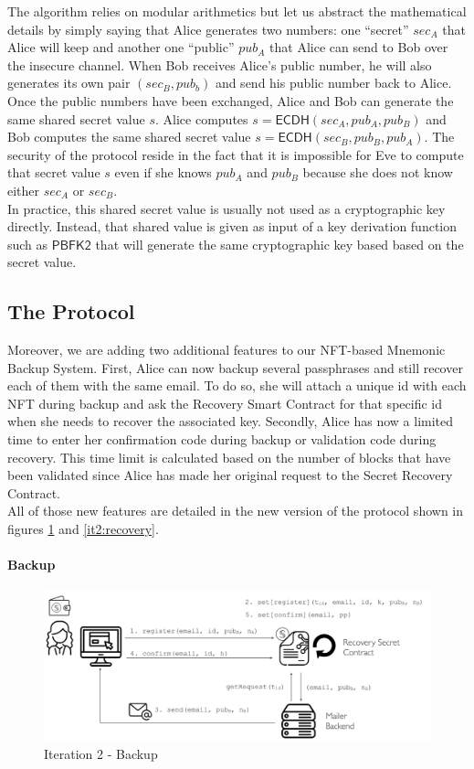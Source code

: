 \documentclass[12pt]{article}
\newcommand{\ms}[1]{\ensuremath{\mathsf{#1}}}
\begin{document}
The algorithm relies on modular arithmetics but let us abstract the mathematical details by simply saying that Alice generates two numbers: one ``secret'' $sec_A$ that Alice will keep and another one ``public'' $pub_A$ that Alice can send to Bob over the insecure channel. When Bob receives Alice's public number, he will also generates its own pair $(sec_B, pub_b)$ and send his public number back to Alice. Once the public numbers have been exchanged, Alice and Bob can generate the same shared secret value $s$. Alice computes $s=\ms{ECDH}(sec_A, pub_A, pub_B)$ and Bob computes the same shared secret value $s=\ms{ECDH}(sec_B, pub_B, pub_A)$. The security of the protocol reside in the fact that it is impossible for Eve to compute that secret value $s$ even if she knows $pub_A$ and $pub_B$ because she does not know either $sec_A$ or $sec_B$. \\

In practice, this shared secret value is usually not used as a cryptographic key directly. Instead, that shared value is given as input of a key derivation function such as $\ms{PBFK2}$ that will generate the same cryptographic key based based on the secret value. 

\subsection{The Protocol}

Moreover, we are adding two additional features to our NFT-based Mnemonic Backup System. First, Alice can now backup several passphrases and still recover each of them with the same email. To do so, she will attach a unique id with each NFT during backup and ask the Recovery Smart Contract for that specific id when she needs to recover the associated key. Secondly, Alice has now a limited time to enter her confirmation code during backup or validation code during recovery. This time limit is calculated based on the number of blocks that have been validated since Alice has made her original request to the Secret Recovery Contract. \\

All of those new features are detailed in the new version of the protocol shown in figures \ref{it2:backup} and \ref{it2:recovery}.

\paragraph{Backup}

\begin{figure}[h!]
  \includegraphics[width=\linewidth]{./media/media-003.png}
  \caption{Iteration 2 - Backup}
  \label{it2:backup}
\end{figure}
\end{document}
